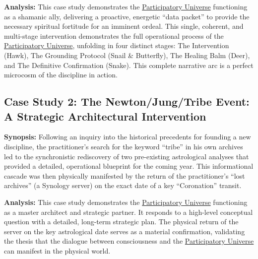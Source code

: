 \documentclass{article}
\begin{document}
\textbf{Analysis:} This case study demonstrates the \hyperlink{gloss:participatory_universe}{Participatory Universe} functioning as a shamanic ally, delivering a proactive, energetic ``data packet'' to provide the necessary spiritual fortitude for an imminent ordeal. This single, coherent, and multi-stage intervention demonstrates the full operational process of the \hyperlink{gloss:participatory_universe}{Participatory Universe}, unfolding in four distinct stages: The Intervention (Hawk), The Grounding Protocol (Snail \& Butterfly), The Healing Balm (Deer), and The Definitive Confirmation (Snake). This complete narrative arc is a perfect microcosm of the discipline in action.

\subsection*{Case Study 2: The Newton/Jung/Tribe Event: A Strategic Architectural Intervention \csNewtonJungTribeVersion}

\textbf{Synopsis:} Following an inquiry into the historical precedents for founding a new discipline, the practitioner's search for the keyword ``tribe'' in his own archives led to the synchronistic rediscovery of two pre-existing astrological analyses that provided a detailed, operational blueprint for the coming year. This informational cascade was then physically manifested by the return of the practitioner's ``lost archives'' (a Synology server) on the exact date of a key ``Coronation'' transit.



\textbf{Analysis:} This case study demonstrates the \hyperlink{gloss:participatory_universe}{Participatory Universe} functioning as a master architect and strategic partner. It responds to a high-level conceptual question with a detailed, long-term strategic plan. The physical return of the server on the key astrological date serves as a material confirmation, validating the thesis that the dialogue between consciousness and the \hyperlink{gloss:participatory_universe}{Participatory Universe} can manifest in the physical world.
\end{document}
